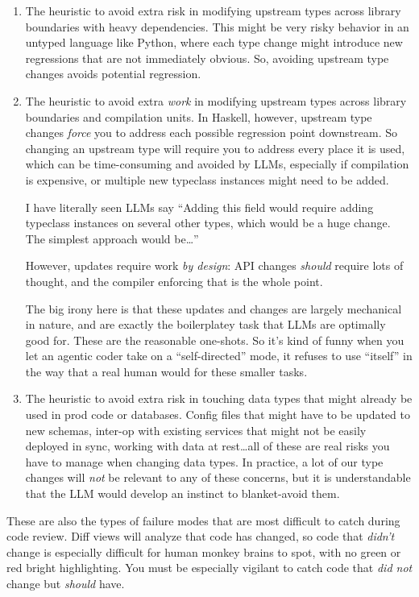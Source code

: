 \documentclass[]{article}
\begin{document}
\begin{enumerate}
\def\labelenumi{\arabic{enumi}.}
\item
  The heuristic to avoid extra risk in modifying upstream types across library
  boundaries with heavy dependencies. This might be very risky behavior in an
  untyped language like Python, where each type change might introduce new
  regressions that are not immediately obvious. So, avoiding upstream type
  changes avoids potential regression.
\item
  The heuristic to avoid extra \emph{work} in modifying upstream types across
  library boundaries and compilation units. In Haskell, however, upstream type
  changes \emph{force} you to address each possible regression point downstream.
  So changing an upstream type will require you to address every place it is
  used, which can be time-consuming and avoided by LLMs, especially if
  compilation is expensive, or multiple new typeclass instances might need to be
  added.

  I have literally seen LLMs say {``Adding this field would require adding
  typeclass instances on several other types, which would be a huge change. The
  simplest approach would be\ldots{}''}

  However, updates require work \emph{by design}: API changes \emph{should}
  require lots of thought, and the compiler enforcing that is the whole point.

  The big irony here is that these updates and changes are largely mechanical in
  nature, and are exactly the boilerplatey task that LLMs are optimally good
  for. These are the reasonable one-shots. So it's kind of funny when you let an
  agentic coder take on a ``self-directed'' mode, it refuses to use ``itself''
  in the way that a real human would for these smaller tasks.
\item
  The heuristic to avoid extra risk in touching data types that might already be
  used in prod code or databases. Config files that might have to be updated to
  new schemas, inter-op with existing services that might not be easily deployed
  in sync, working with data at rest\ldots all of these are real risks you have
  to manage when changing data types. In practice, a lot of our type changes
  will \emph{not} be relevant to any of these concerns, but it is understandable
  that the LLM would develop an instinct to blanket-avoid them.
\end{enumerate}

These are also the types of failure modes that are most difficult to catch
during code review. Diff views will analyze that code has changed, so code that
\emph{didn't} change is especially difficult for human monkey brains to spot,
with no green or red bright highlighting. You must be especially vigilant to
catch code that \emph{did not} change but \emph{should} have.
\end{document}
